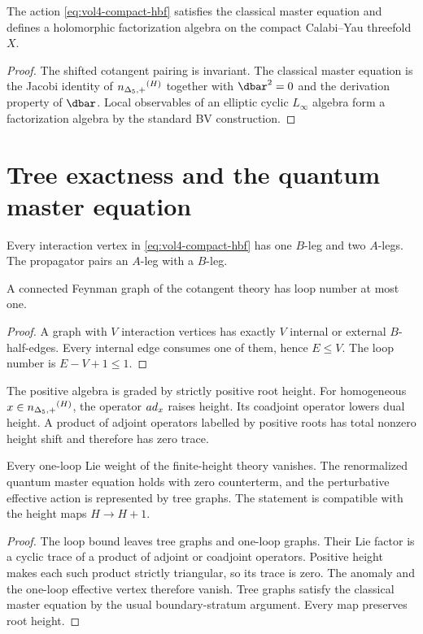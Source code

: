 \begin{theorem}
The action \eqref{eq:vol4-compact-hbf} satisfies the classical master equation and defines a holomorphic factorization algebra on the compact Calabi--Yau threefold $X$.
\end{theorem}
\begin{proof}
The shifted cotangent pairing is invariant.  The classical master equation is the Jacobi identity of ${n_{\Delta_5,+}}^{(H)}$ together with $\dbar^2=0$ and the derivation property of $\dbar$.  Local observables of an elliptic cyclic $L_\infty$ algebra form a factorization algebra by the standard BV construction.
\end{proof}

\chapter{Tree exactness and the quantum master equation}
Every interaction vertex in \eqref{eq:vol4-compact-hbf} has one $B$-leg and two $A$-legs.  The propagator pairs an $A$-leg with a $B$-leg.

\begin{lemma}
A connected Feynman graph of the cotangent theory has loop number at most one.
\end{lemma}
\begin{proof}
A graph with $V$ interaction vertices has exactly $V$ internal or external $B$-half-edges.  Every internal edge consumes one of them, hence $E\le V$.  The loop number is $E-V+1\le1$.
\end{proof}

The positive algebra is graded by strictly positive root height.  For homogeneous $x\in{n_{\Delta_5,+}}^{(H)}$, the operator $ad_x$ raises height.  Its coadjoint operator lowers dual height.  A product of adjoint operators labelled by positive roots has total nonzero height shift and therefore has zero trace.

\begin{theorem}
Every one-loop Lie weight of the finite-height theory vanishes.  The renormalized quantum master equation holds with zero counterterm, and the perturbative effective action is represented by tree graphs.  The statement is compatible with the height maps $H\to H+1$.
\end{theorem}
\begin{proof}
The loop bound leaves tree graphs and one-loop graphs.  Their Lie factor is a cyclic trace of a product of adjoint or coadjoint operators.  Positive height makes each such product strictly triangular, so its trace is zero.  The anomaly and the one-loop effective vertex therefore vanish.  Tree graphs satisfy the classical master equation by the usual boundary-stratum argument.  Every map preserves root height.
\end{proof}

